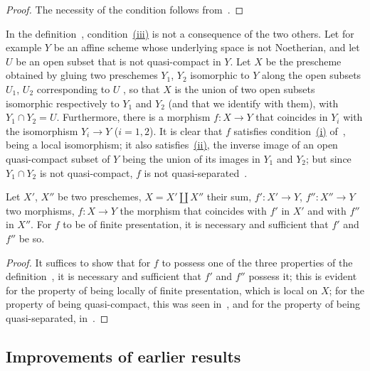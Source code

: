 \begin{proof}
The necessity of the condition follows from~.
\end{proof}

\begin{remark}[1.6.4]
\label{IV.1.6.4}
In the definition~, condition~{\hyperlink{ega4.c04.def.1-6-1}{(iii)}} is not a consequence of the two others.
Let for example $Y$ be an affine scheme whose underlying space is not Noetherian, and let $U$ be an open subset that is not quasi-compact in $Y$.
Let $X$ be the prescheme obtained by gluing two preschemes $Y_1$, $Y_2$ isomorphic to $Y$ along the open subsets $U_1$, $U_2$ corresponding to $U$ , so that $X$ is the union of two open subsets isomorphic respectively to $Y_1$ and $Y_2$ (and that we identify with them), with $Y_1\cap Y_2=U$.
Furthermore, there is a morphism $f:X\to Y$ that coincides in $Y_i$ with the isomorphism $Y_i\to Y$ ($i=1,2$).
It is clear that $f$ satisfies condition~{\hyperlink{ega4.c04.def.1-6-1}{(i)}} of~, being a local isomorphism; it also satisfies~{\hyperlink{ega4.c04.def.1-6-1}{(ii)}}, the inverse image of an open quasi-compact subset of $Y$ being the union of its images in $Y_1$ and $Y_2$; but since $Y_1\cap Y_2$ is not quasi-compact, $f$ is not quasi-separated~.
\end{remark}

\begin{proposition}[1.6.5]
\label{IV.1.6.5}
Let $X'$, $X''$ be two preschemes, $X=X'\amalg X''$ their sum, $f':X'\to Y$, $f'':X''\to Y$ two morphisms, $f:X\to Y$ the morphism that coincides with $f'$ in $X'$ and with $f''$ in $X''$.
For $f$ to be of finite presentation, it is necessary and sufficient that $f'$ and $f''$ be so.
\end{proposition}

\begin{proof}
It suffices to show that for $f$ to possess one of the three properties of the definition~,
it is necessary and sufficient that $f'$ and $f''$ possess it; this is evident for the property of being locally of finite presentation, which is local on $X$; for the property of being quasi-compact, this was seen in~, and for the property of being quasi-separated, in~.
\end{proof}

\subsection{Improvements of earlier results}
\label{subsection:IV.1.7}

